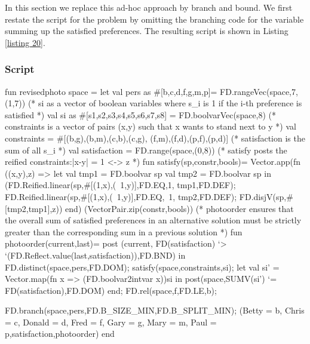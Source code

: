 \documentclass[a4paper]{scrartcl}
\begin{document}
In this section we replace this ad-hoc approach by branch and bound. 
We first restate the script for the problem by omitting the branching 
code for the variable summing up the satisfied preferences. The resulting 
script is shown in Listing \ref{listing 20}.

\subsubsection{Script}
\begin{myverbatim}
fun revisedphoto space =
    let 
        val pers as #[b,c,d,f,g,m,p]= 
                      FD.rangeVec(space,7,(1,7))
       (* si as a vector of boolean variables where s_i is 1 
          if the i-th preference is satisfied *)
        val si as #[s1,s2,s3,s4,s5,s6,s7,s8] = 
                           FD.boolvarVec(space,8)
       (* constraints is a vector of pairs (x,y) such that x wants to
          stand next to y *)
        val constraints = #[(b,g),(b,m),(c,b),(c,g),
                            (f,m),(f,d),(p,f),(p,d)]
       (* satisfaction is the sum of all s_i *)
        val satisfaction = FD.range(space,(0,8))
       (* satisfy posts the reified constraints:|x-y| = 1 <-> z *)
        fun satisfy(sp,constr,bools)= 
            Vector.app(fn ((x,y),z) => 
              let
                 val tmp1 = FD.boolvar sp
                 val tmp2 = FD.boolvar sp
              in
                (FD.Reified.linear(sp,#[(1,x),(~1,y)],FD.EQ,1,
                                      tmp1,FD.DEF);
                 FD.Reified.linear(sp,#[(1,x),(~1,y)],FD.EQ,~1,
                                      tmp2,FD.DEF);
                 FD.disjV(sp,#[tmp2,tmp1],z))
              end)
                 (VectorPair.zip(constr,bools))
       (* photoorder ensures that the overall sum of satisfied
          preferences in an alternative solution must be strictly 
          greater than the corresponding sum in a previous solution *)
        fun photoorder(current,last)=
            post (current, FD(satisfaction) `> 
                  `(FD.Reflect.value(last,satisfaction)),FD.BND)                   
    in
        FD.distinct(space,pers,FD.DOM);
        satisfy(space,constraints,si);
        let 
           val si' = Vector.map(fn x => (FD.boolvar2intvar x))si
        in
           post(space,SUMV(si') `= FD(satisfaction),FD.DOM)
        end;
        FD.rel(space,f,FD.LE,b);
           
        FD.branch(space,pers,FD.B_SIZE_MIN,FD.B_SPLIT_MIN);
      ({Betty = b, Chris = c, Donald = d, Fred = f,
       Gary = g, Mary = m, Paul = p,satisfaction},photoorder)
   end
\end{myverbatim}
\end{document}
